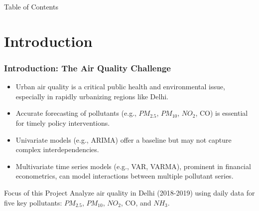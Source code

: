 \documentclass[svgnames, 12pt]{beamer}
\begin{document}
\begin{frame}{Table of Contents}
\tableofcontents
\end{frame}

\section{Introduction}
\begin{frame}
    \frametitle{Introduction: The Air Quality Challenge}
    \begin{itemize}
        \item Urban air quality is a critical public health and environmental issue, especially in rapidly urbanizing regions like Delhi.
        \item Accurate forecasting of pollutants (e.g., $PM_{2.5}$, $PM_{10}$, $NO_2$, CO) is essential for timely policy interventions.
        \item Univariate models (e.g., ARIMA) offer a baseline but may not capture complex interdependencies.
        \item Multivariate time series models (e.g., VAR, VARMA), prominent in financial econometrics, can model interactions between multiple pollutant series.
    \end{itemize}
    \vspace{0.5cm}
    \begin{block}{Focus of this Project}
        Analyze air quality in Delhi (2018-2019) using daily data for five key pollutants: $PM_{2.5}$, $PM_{10}$, $NO_2$, CO, and $NH_3$.
    \end{block}
\end{frame}
\end{document}

